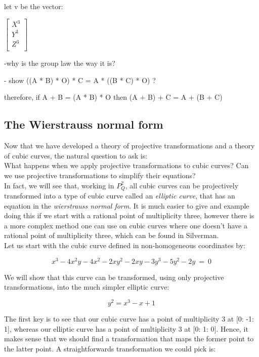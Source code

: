 \documentclass{article}
\begin{document}
let v be the vector:

$
\begin{bmatrix}
X^3 \\
Y^3 \\
Z^3 \\
\end{bmatrix} 
$

-why is the group law the way it is?

- show ((A * B) * O) * C = A * ((B * C) * O) ?

therefore, if A + B = (A * B) * O then (A + B) + C = A + (B + C)


\subsection{The Wierstrauss normal form}

Now that we have developed a theory of projective transformations and a theory of cubic curves, the natural question to ask is:\\

What happens when we apply projective transformations to cubic curves? Can we use projective transformations to simplify their equations?\\

In fact, we will see that, working in $P_Q^2$, all cubic curves can be projectively transformed into a type of cubic curve called an \emph{elliptic curve}, that has an equation in the \emph{wierstrauss normal form}. It is much easier to give and example doing this if we start with a rational point of multiplicity three, however there is a more complex method one can use on cubic curves where one doesn't have a rational point of multiplicity three, which can be found in Silverman.\\

Let us start with the cubic curve defined in non-homogeneous coordinates by:

\[ x^{3} - 4 x^{2} y - 4 x^{2} - 2 x y^{2} - 2 x y - 3 y^{3} - 5 y^{2} - 2 y\ =\ 0 \]

We will show that this curve can be transformed, using only projective transformations, into the much simpler elliptic curve:

\[y^2 = x^3 - x + 1\]

The first key is to see that our cubic curve has a point of multiplicity $3$ at [0: -1: 1], whereas our elliptic curve has a point of multiplicity $3$ at [0: 1: 0]. Hence, it makes sense that we should find a transformation that maps the former point to the latter point. A straightforwards transformation we could pick is:
\end{document}
